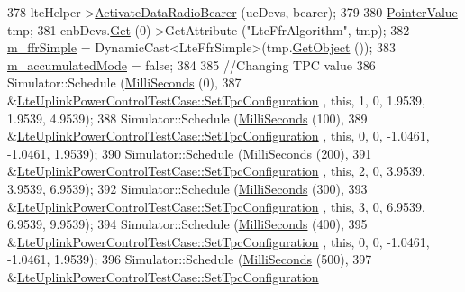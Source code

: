 \begin{DoxyCode}
378   lteHelper->\hyperlink{classns3_1_1LteHelper_ac896e16cf162e4beeaa292d39ab1b700}{ActivateDataRadioBearer} (ueDevs, bearer);
379 
380   \hyperlink{classns3_1_1PointerValue}{PointerValue} tmp;
381   enbDevs.\hyperlink{classns3_1_1PointerValue_ae8e90fe3c0810cd6e4e1b1ba31f52a66}{Get} (0)->GetAttribute (\textcolor{stringliteral}{"LteFfrAlgorithm"}, tmp);
382   \hyperlink{classLteUplinkPowerControlTestCase_ac0e14f35a6bc7b99242efc3985a87d4e}{m\_ffrSimple} = DynamicCast<LteFfrSimple>(tmp.\hyperlink{classns3_1_1PointerValue_a53d0f9f5c538ea6120c96a1ecb1344a8}{GetObject} ());
383   \hyperlink{classLteUplinkPowerControlTestCase_a68142bcda5a786775546febd8aed11df}{m\_accumulatedMode} = \textcolor{keyword}{false};
384 
385   \textcolor{comment}{//Changing TPC value}
386   Simulator::Schedule (\hyperlink{group__timecivil_gaf26127cf4571146b83a92ee18679c7a9}{MilliSeconds} (0),
387                        &\hyperlink{classLteUplinkPowerControlTestCase_a91e2e46a5fa22677a33d5328ac9789b8}{LteUplinkPowerControlTestCase::SetTpcConfiguration}
      , \textcolor{keyword}{this}, 1, 0, 1.9539, 1.9539, 4.9539);
388   Simulator::Schedule (\hyperlink{group__timecivil_gaf26127cf4571146b83a92ee18679c7a9}{MilliSeconds} (100),
389                        &\hyperlink{classLteUplinkPowerControlTestCase_a91e2e46a5fa22677a33d5328ac9789b8}{LteUplinkPowerControlTestCase::SetTpcConfiguration}
      , \textcolor{keyword}{this}, 0, 0, -1.0461, -1.0461, 1.9539);
390   Simulator::Schedule (\hyperlink{group__timecivil_gaf26127cf4571146b83a92ee18679c7a9}{MilliSeconds} (200),
391                        &\hyperlink{classLteUplinkPowerControlTestCase_a91e2e46a5fa22677a33d5328ac9789b8}{LteUplinkPowerControlTestCase::SetTpcConfiguration}
      , \textcolor{keyword}{this}, 2, 0, 3.9539, 3.9539, 6.9539);
392   Simulator::Schedule (\hyperlink{group__timecivil_gaf26127cf4571146b83a92ee18679c7a9}{MilliSeconds} (300),
393                        &\hyperlink{classLteUplinkPowerControlTestCase_a91e2e46a5fa22677a33d5328ac9789b8}{LteUplinkPowerControlTestCase::SetTpcConfiguration}
      , \textcolor{keyword}{this}, 3, 0, 6.9539, 6.9539, 9.9539);
394   Simulator::Schedule (\hyperlink{group__timecivil_gaf26127cf4571146b83a92ee18679c7a9}{MilliSeconds} (400),
395                        &\hyperlink{classLteUplinkPowerControlTestCase_a91e2e46a5fa22677a33d5328ac9789b8}{LteUplinkPowerControlTestCase::SetTpcConfiguration}
      , \textcolor{keyword}{this}, 0, 0, -1.0461, -1.0461, 1.9539);
396   Simulator::Schedule (\hyperlink{group__timecivil_gaf26127cf4571146b83a92ee18679c7a9}{MilliSeconds} (500),
397                        &\hyperlink{classLteUplinkPowerControlTestCase_a91e2e46a5fa22677a33d5328ac9789b8}{LteUplinkPowerControlTestCase::SetTpcConfiguration}

\end{DoxyCode}
